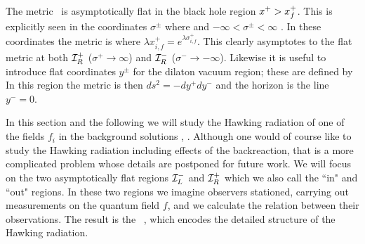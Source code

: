 
The metric \gensol\ is
asymptotically flat in the black hole region $x^+>x^+_f$.  This is
explicitly seen in the coordinates $\sigma^\pm$ where
%
\eqn{}
%
and $-\infty < \sigma^{\pm} < \infty$ .
In these coordinates the metric is
%
\eqn{}%
%
where
$\lambda x_{i,f}^{+} = e^{\lambda\sigma_{i,f}^{+}}$.  This clearly asymptotes
to
the flat metric at both ${\cal I}_R^+$ ($\sigma^+\rightarrow\infty$) and
${\cal I}_R^-$ ($\sigma^-\rightarrow -\infty$).
Likewise it is useful to introduce flat coordinates $y^\pm$ for the
dilaton vacuum region; these are defined by
%
\eqn{}
%
In this region the metric is then $ds^2 = -dy^{+} dy^{-} $ and the horizon
is the line $y^{-}=0$.


In this section and the following we will study the Hawking radiation of
one of the fields $f_i$ in the background solutions
\collsoln, \gensol.  Although one would of course like to study the Hawking
radiation including effects of the backreaction, that is a more complicated
problem whose details are postponed for future work.
We will focus
on the two asymptotically flat regions
${\cal I}_L^-$ and ${\cal I}_R^+$ which we also call the ``in" and ``out"
regions.
In these two regions we imagine observers
stationed, carrying out measurements on the quantum field $f$, and we
calculate the relation between their observations. The result is the \Bog\
\Xm, which encodes the detailed structure
of the Hawking radiation.

